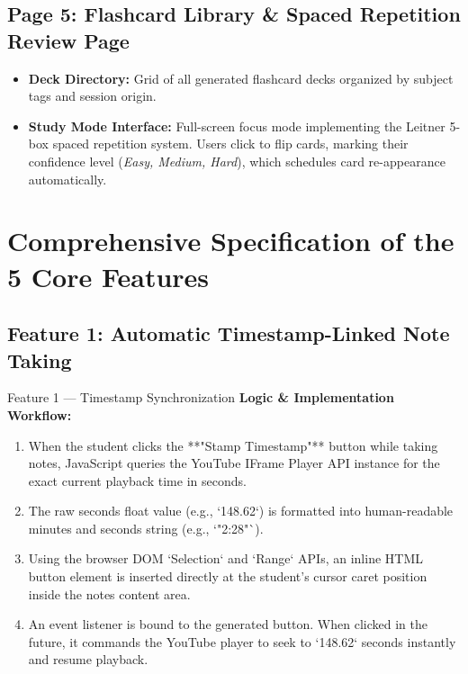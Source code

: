 \documentclass[12pt,a4paper]{article}
\begin{document}
\subsection{Page 5: Flashcard Library \& Spaced Repetition Review Page}
\begin{itemize}[leftmargin=1.2cm]
    \item \textbf{Deck Directory:} Grid of all generated flashcard decks organized by subject tags and session origin.
    \item \textbf{Study Mode Interface:} Full-screen focus mode implementing the Leitner 5-box spaced repetition system. Users click to flip cards, marking their confidence level (\textit{Easy, Medium, Hard}), which schedules card re-appearance automatically.
\end{itemize}

\section{Comprehensive Specification of the 5 Core Features}

\subsection{Feature 1: Automatic Timestamp-Linked Note Taking}
\begin{featurebox}{Feature 1 --- Timestamp Synchronization}
\textbf{Logic \& Implementation Workflow:} 
\begin{enumerate}[leftmargin=1.2cm]
    \item When the student clicks the **"Stamp Timestamp"** button while taking notes, JavaScript queries the YouTube IFrame Player API instance for the exact current playback time in seconds.
    \item The raw seconds float value (e.g., `148.62`) is formatted into human-readable minutes and seconds string (e.g., `"2:28"`).
    \item Using the browser DOM `Selection` and `Range` APIs, an inline HTML button element is inserted directly at the student's cursor caret position inside the notes content area.
    \item An event listener is bound to the generated button. When clicked in the future, it commands the YouTube player to seek to `148.62` seconds instantly and resume playback.
\end{enumerate}
\end{featurebox}
\end{document}
